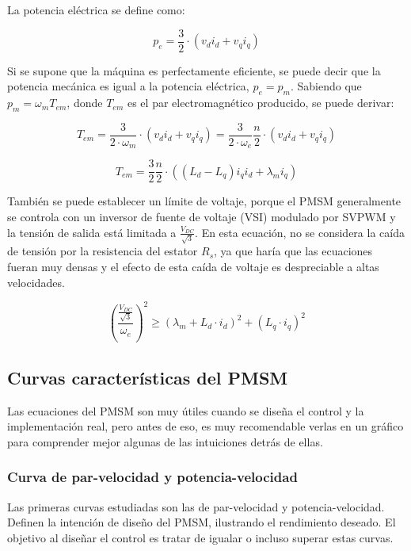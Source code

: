 La potencia eléctrica se define como:

\begin{equation}
p_e = \frac{3}{2}\cdot(v_d i_d + v_q i_q)
\end{equation}

Si se supone que la máquina es perfectamente eficiente, se puede decir que la potencia mecánica es igual a la potencia eléctrica, \(p_e = p_m\). Sabiendo que \(p_m = \omega_m T_{em}\), donde \(T_{em}\) es el par electromagnético producido, se puede derivar:

\begin{equation}
T_{em} = \frac{3}{2\cdot \omega_m}\cdot(v_d i_d + v_q i_q) = \frac{3}{2\cdot \omega_e}\frac{n}{2}\cdot(v_d i_d + v_q i_q)
\end{equation}

\begin{equation}
T_{em} = \frac{3}{2}\frac{n}{2}\cdot((L_d - L_q) i_q i_d + \lambda_m i_q)
\end{equation}

También se puede establecer un límite de voltaje, porque el PMSM generalmente se controla con un inversor de fuente de voltaje (VSI) modulado por SVPWM y la tensión de salida está limitada a \(\frac{V_{DC}}{\sqrt{3}}\). En esta ecuación, no se considera la caída de tensión por la resistencia del estator \(R_s\), ya que haría que las ecuaciones fueran muy densas y el efecto de esta caída de voltaje es despreciable a altas velocidades.

\begin{equation}
\left(\frac{\frac{V_{DC}}{\sqrt{3}}}{\omega_e}\right)^2 \geq \left(\lambda_m+L_d\cdot i_d\right)^2+(L_q\cdot i_q)^2
\end{equation}

\subsection{Curvas características del PMSM}

Las ecuaciones del PMSM son muy útiles cuando se diseña el control y la implementación real, pero antes de eso, es muy recomendable verlas en un gráfico para comprender mejor algunas de las intuiciones detrás de ellas.

\subsubsection{Curva de par-velocidad y potencia-velocidad}

Las primeras curvas estudiadas son las de par-velocidad y potencia-velocidad. Definen la intención de diseño del PMSM, ilustrando el rendimiento deseado. El objetivo al diseñar el control es tratar de igualar o incluso superar estas curvas.


